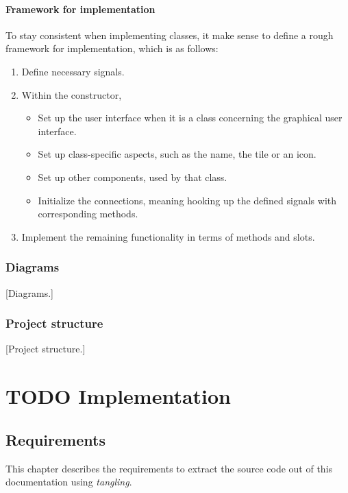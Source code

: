 \documentclass[10pt, openright, notitlepage]{scrreprt}
\begin{document}
\subsubsection{Framework for implementation}
\label{sec:framework-for-implementation}
To stay consistent when implementing classes, it make sense to define a rough
framework for implementation, which is as follows:

\begin{enumerate}
\item Define necessary signals.
\item Within the constructor,
\begin{itemize}
\item Set up the user interface when it is a class concerning the graphical user
interface.
\item Set up class-specific aspects, such as the name, the tile or an icon.
\item Set up other components, used by that class.
\item Initialize the connections, meaning hooking up the defined signals with
corresponding methods.
\end{itemize}
\item Implement the remaining functionality in terms of methods and slots.
\end{enumerate}

\subsection{Diagrams}
\label{sec:org36b6c39}

[Diagrams.]

\subsection{Project structure}
\label{sec:org2e3bebb}

[Project structure.]

\chapter{{\bfseries\sffamily TODO} Implementation}
\label{sec:org8bd62c5}

\section{Requirements}
\label{sec:org8216c6a}

This chapter describes the requirements to extract the source code out of this
documentation using \emph{tangling}.
\end{document}
